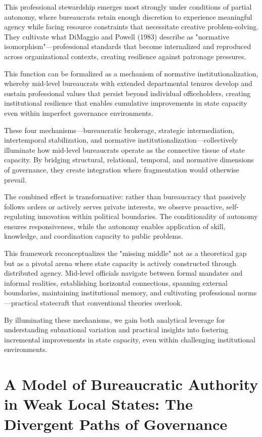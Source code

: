 This professional stewardship emerges most strongly under conditions of partial autonomy, where bureaucrats retain enough discretion to experience meaningful agency while facing resource constraints that necessitate creative problem-solving. They cultivate what DiMaggio and Powell (1983) describe as "normative isomorphism"—professional standards that become internalized and reproduced across organizational contexts, creating resilience against patronage pressures.

This function can be formalized as a mechanism of normative institutionalization, whereby mid-level bureaucrats with extended departmental tenures develop and sustain professional values that persist beyond individual officeholders, creating institutional resilience that enables cumulative improvements in state capacity even within imperfect governance environments.


These four mechanisms—bureaucratic brokerage, strategic intermediation, intertemporal stabilization, and normative institutionalization—collectively illuminate how mid-level bureaucrats operate as the connective tissue of state capacity. By bridging structural, relational, temporal, and normative dimensions of governance, they create integration where fragmentation would otherwise prevail.

The combined effect is transformative: rather than bureaucracy that passively follows orders or actively serves private interests, we observe proactive, self-regulating innovation within political boundaries. The conditionality of autonomy ensures responsiveness, while the autonomy enables application of skill, knowledge, and coordination capacity to public problems.

This framework reconceptualizes the "missing middle" not as a theoretical gap but as a pivotal arena where state capacity is actively constructed through distributed agency. Mid-level officials navigate between formal mandates and informal realities, establishing horizontal connections, spanning external boundaries, maintaining institutional memory, and cultivating professional norms—practical statecraft that conventional theories overlook.

By illuminating these mechanisms, we gain both analytical leverage for understanding subnational variation and practical insights into fostering incremental improvements in state capacity, even within challenging institutional environments.

\section{A Model of Bureaucratic Authority in Weak Local States: The Divergent Paths of Governance}

